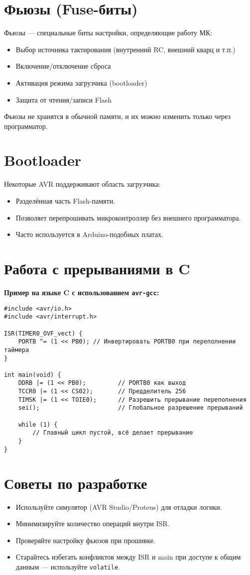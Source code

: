 \documentclass[a4paper,12pt]{article}
\begin{document}
\section{Фьюзы (Fuse-биты)}
Фьюзы — специальные биты настройки, определяющие работу МК:
\begin{itemize}
    \item Выбор источника тактирования (внутренний RC, внешний кварц и т.п.)
    \item Включение/отключение сброса
    \item Активация режима загрузчика (bootloader)
    \item Защита от чтения/записи Flash
\end{itemize}

Фьюзы не хранятся в обычной памяти, и их можно изменить только через программатор.

\section{Bootloader}
Некоторые AVR поддерживают область загрузчика:
\begin{itemize}
    \item Разделённая часть Flash-памяти.
    \item Позволяет перепрошивать микроконтроллер без внешнего программатора.
    \item Часто используется в Arduino-подобных платах.
\end{itemize}

\section{Работа с прерываниями в C}
\textbf{Пример на языке C с использованием \texttt{avr-gcc}:}

\begin{verbatim}
#include <avr/io.h>
#include <avr/interrupt.h>

ISR(TIMER0_OVF_vect) {
    PORTB ^= (1 << PB0); // Инвертировать PORTB0 при переполнении таймера
}

int main(void) {
    DDRB |= (1 << PB0);         // PORTB0 как выход
    TCCR0 |= (1 << CS02);       // Предделитель 256
    TIMSK |= (1 << TOIE0);      // Разрешить прерывание переполнения
    sei();                      // Глобальное разрешение прерываний

    while (1) {
        // Главный цикл пустой, всё делает прерывание
    }
}
\end{verbatim}

\section{Советы по разработке}
\begin{itemize}
    \item Используйте симулятор (AVR Studio/Proteus) для отладки логики.
    \item Минимизируйте количество операций внутри ISR.
    \item Проверяйте настройку фьюзов при прошивке.
    \item Старайтесь избегать конфликтов между ISR и main при доступе к общим данным — используйте \texttt{volatile}.
\end{itemize}
\end{document}
